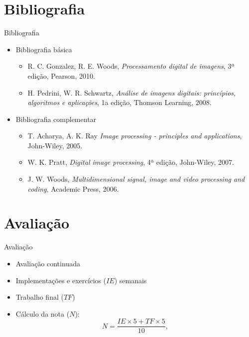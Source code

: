    \section[ slide = true]{Bibliografia}
   \begin{slide}[toc=]{Bibliografia}
      \begin{itemize}
       \item Bibliografia básica
       \begin{itemize}
          \item R. C. Gonzalez, R. E. Woods, \emph{Processamento digital de imagens}, 3ª edição, Pearson, 2010.
          \item H. Pedrini, W. R. Schwartz, \emph{Análise de imagens digitais: princípios, algoritmos e aplicações}, 1a edição, Thomson Learning, 2008.
       \end{itemize}
       \item Bibliografia complementar
       \begin{itemize}
          \item T. Acharya, A. K. Ray \emph{Image processing - principles and applications}, John-Wiley,  2005.
          \item W. K. Pratt, \emph{Digital image processing}, 4ª edição, John-Wiley,  2007.
          \item J. W. Woods, \emph{Multidimensional signal, image and video processing and coding}, Academic Press,  2006.
       \end{itemize}
      \end{itemize}
   \end{slide}
   
   \section[ slide = true]{Avaliação}
      \begin{slide}[toc=]{Avaliação}
         \begin{itemize}[type=1]
            \item Avaliação continuada%
            \item Implementações e exercícios ($IE$) semanais%
            \item Trabalho final ($TF$)%
            \item Cálculo da nota ($N$):
            \begin{equation*}
               N=\frac{IE \times 5 + TF\times 5}{10},
            \end{equation*}
          \end{itemize}
      \end{slide}


